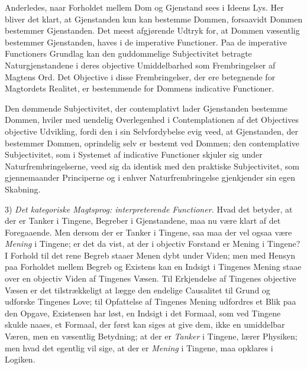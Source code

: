 \documentclass[12pt]{book}
\newcommand{\opage}[1]{\marginnote{\footnotesize\textit{[#1]}}}
\begin{document}
Anderledes, naar Forholdet mellem Dom og Gjenstand
sees i Ideens Lys. Her bliver det klart, at Gjenstanden kun
kan bestemme Dommen, forsaavidt Dommen bestemmer Gjenstanden.
Det meest afgjørende Udtryk for, at Dommen væsentlig
bestemmer Gjenstanden, haves i de imperative Functioner.
Paa de imperative Functioners Grundlag kan den
\opage{166}guddommelige Subjectivitet betragte Naturgjenstandene i deres
objective Umiddelbarhed som Frembringelser af Magtens Ord.
Det Objective i disse Frembringelser, der ere betegnende for
Magtordets Realitet, er bestemmende for Dommens indicative
Functioner.

Den dømmende Subjectivitet, der contemplativt lader
Gjenstanden bestemme Dommen, hviler med uendelig Overlegenhed
i Contemplationen af det Objectives objective Udvikling,
fordi den i sin Selvfordybelse evig veed, at Gjenstanden,
der bestemmer Dommen, oprindelig selv er bestemt ved Dommen;
den contemplative Subjectivitet, som i Systemet af indicative
Functioner skjuler sig under Naturfrembringelserne, veed sig
da identisk med den praktiske Subjectivitet, som gjennemaander
Principerne og i enhver Naturfrembringelse gjenkjender sin
egen Skabning.

3) \emph{Det kategoriske Magtsprog: interpreterende
Functioner.} Hvad det betyder, at der er Tanker i Tingene,
Begreber i Gjenstandene, maa nu være klart af det Foregaaende.
Men dersom der er Tanker i Tingene, saa maa
der vel ogsaa være \emph{Mening} i Tingene; er det da vist, at der
i objectiv Forstand er Mening i Tingene? I Forhold til det
rene Begreb staaer Menen dybt under Viden; men med Hensyn
paa Forholdet mellem Begreb og Existens kan en Indsigt
i Tingenes Mening staae over en objectiv Viden af
Tingenes Væsen. Til Erkjendelse af Tingenes objective
Væsen er det tilstrækkeligt at lægge den endelige Causalitet til
Grund og udforske Tingenes Love; til Opfattelse af Tingenes
Mening udfordres et Blik paa den Opgave, Existensen har
løst, en Indsigt i det Formaal, som ved Tingene skulde naaes,
et Formaal, der først kan siges at give dem, ikke en umiddelbar
Væren, men en væsentlig Betydning; at der er \emph{Tanker}
i Tingene, lærer Physiken; men hvad det egentlig vil sige, at
der er \emph{Mening} i Tingene, maa opklares i Logiken.
\end{document}
